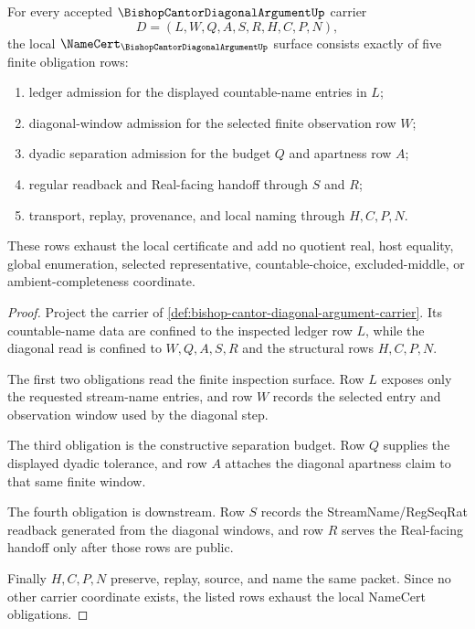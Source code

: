 \begin{theorem}
\label{thm:bishop-cantor-diagonal-argument-namecert-obligations}
For every accepted $\BishopCantorDiagonalArgumentUp$ carrier
$$
D=(L,W,Q,A,S,R,H,C,P,N),
$$
the local $\NameCert_{\BishopCantorDiagonalArgumentUp}$ surface consists exactly of five finite obligation rows:
\begin{enumerate}
\item ledger admission for the displayed countable-name entries in $L$;
\item diagonal-window admission for the selected finite observation row $W$;
\item dyadic separation admission for the budget $Q$ and apartness row $A$;
\item regular readback and Real-facing handoff through $S$ and $R$;
\item transport, replay, provenance, and local naming through $H,C,P,N$.
\end{enumerate}
These rows exhaust the local certificate and add no quotient real, host equality, global enumeration, selected representative, countable-choice, excluded-middle, or ambient-completeness coordinate.
\end{theorem}
\begin{proof}
Project the carrier of \autoref{def:bishop-cantor-diagonal-argument-carrier}. Its countable-name data are confined to the inspected ledger row $L$, while the diagonal read is confined to $W,Q,A,S,R$ and the structural rows $H,C,P,N$.

The first two obligations read the finite inspection surface. Row $L$ exposes only the requested stream-name entries, and row $W$ records the selected entry and observation window used by the diagonal step.

The third obligation is the constructive separation budget. Row $Q$ supplies the displayed dyadic tolerance, and row $A$ attaches the diagonal apartness claim to that same finite window.

The fourth obligation is downstream. Row $S$ records the StreamName/RegSeqRat readback generated from the diagonal windows, and row $R$ serves the Real-facing handoff only after those rows are public.

Finally $H,C,P,N$ preserve, replay, source, and name the same packet. Since no other carrier coordinate exists, the listed rows exhaust the local NameCert obligations.
\end{proof}

